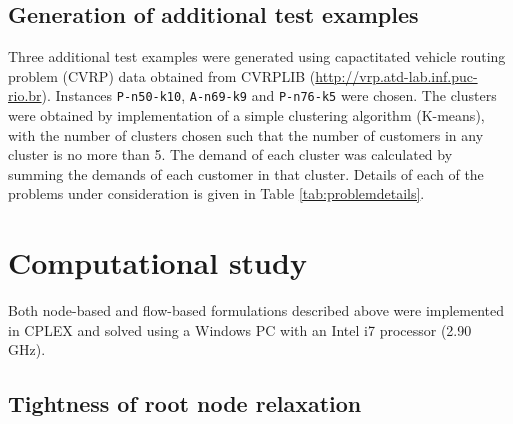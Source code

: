 \documentclass[letterpaper,12pt,onehalfspacing,twoside]{article}
\theoremstyle{msds}
\begin{document}
\subsection{Generation of additional test examples}

Three additional test examples were generated using capactitated vehicle routing problem (CVRP) data obtained from CVRPLIB (\url{http://vrp.atd-lab.inf.puc-rio.br}). Instances \texttt{P-n50-k10}, \texttt{A-n69-k9} and \texttt{P-n76-k5} were chosen. The clusters were obtained by implementation of a simple clustering algorithm (K-means), with the number of clusters chosen such that the number of customers in any cluster is no more than 5. The demand of each cluster was calculated by summing the demands of each customer in that cluster. 
Details of each of the problems under consideration is given in Table \ref{tab:problemdetails}.

\section{Computational study}

Both node-based and flow-based formulations described above were implemented in CPLEX and solved using a Windows PC with an Intel i7 processor (2.90 GHz). 

\subsection{Tightness of root node relaxation}
\end{document}

